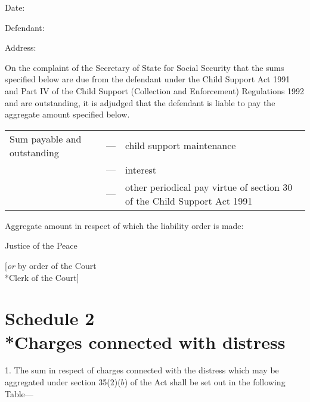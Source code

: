 \documentclass[a4paper]{article}
\newcommand{\parthead}{}
\begin{document}
\medskip

Date:

\medskip

Defendant:

\medskip

Address:

\medskip

On the complaint of the Secretary of State for Social Security that the sums specified below are due from the defendant under the Child Support Act 1991 and Part IV of the Child Support (Collection and Enforcement) Regulations 1992 and are outstanding, it is adjudged that the defendant is liable to pay the aggregate amount specified below.

\medskip

\noindent
\begin{tabulary}{0.9\linewidth}{lJJ}
Sum payable and outstanding \hspace{0.075\linewidth} &  --- & child support maintenance\\
&--- & interest\\
& --- & other periodical pay\- virtue of section 30 of the Child Support Act 1991\\
\end{tabulary}

\medskip

Aggregate amount in respect of which the liability order is made:

\medskip

{\raggedleft Justice of the Peace

\medskip

[\emph{or} by order of the Court\\*Clerk of the Court]

}


\part[Schedule 2 --- Charges connected with distress]{Schedule 2\\*Charges connected with distress}

\renewcommand\parthead{--- Schedule 2}

1.  The sum in respect of charges connected with the distress which may be aggregated under section 35(2)($b$) of the Act shall be set out in the following Table—
\end{document}
